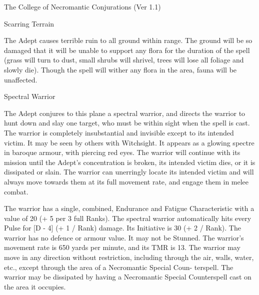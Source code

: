 \begin{Chapter}{The College of Necromantic Conjurations (Ver 1.1)}
\begin{spell}[S-11]{Scarring Terrain}

\begin{effects}
The Adept causes terrible ruin to all ground within range.  The ground
will be so damaged that it will be unable to support any flora for the
duration of the spell (grass will turn to dust, small shrubs will
shrivel, trees will lose all foliage and slowly die).  Though the
spell will wither any flora in the area, fauna will be unaffected.
\end{effects}
\end{spell}

\begin{spell}[S-12]{Spectral Warrior}

\begin{effects}
The Adept conjures to this plane a spectral warrior, and directs the
warrior to hunt down and slay one target, who must be within sight
when the spell is cast.  The warrior is completely insubstantial and
invisible except to its intended victim.  It may be seen by others
with Witchsight.  It appears as a glowing spectre in baroque armour,
with piercing red eyes.  The warrior will continue with its mission
until the Adept’s concentration is broken, its intended victim dies,
or it is dissipated or slain.  The warrior can unerringly locate its
intended victim and will always move towards them at its full movement
rate, and engage them in melee combat.

The warrior has a single, combined, Endurance and Fatigue
Characteristic with a value of 20 (+ 5 per 3 full Ranks).  The
spectral warrior automatically hits every Pulse for [D - 4] (+ 1 /
Rank) damage. Its Initiative is 30 (+ 2 / Rank). The warrior has no
defence or armour value. It may not be Stunned.  The warrior’s
movement rate is 650 yards per minute, and its TMR is 13.  The warrior
may move in any direction without restriction, including through the
air, walls, water, etc., except through the area of a Necromantic
Special Coun- terspell. The warrior may be dissipated by having a
Necromantic Special Counterspell cast on the area it occupies.
\end{effects}
\end{spell}


\end{Chapter}
